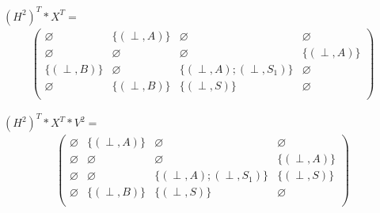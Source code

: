 \documentclass[12pt]{article}  %
\theoremstyle{definition}
\theoremstyle{remark}
\begin{document}
$(H^2)^T * X^T =$
\begin{align*}
\begin{pmatrix}
      \varnothing            & \{ (\perp,A) \}            & \varnothing            & \varnothing            \\
      \varnothing        & \varnothing            & \varnothing                & \{ (\perp,A) \}            \\
      \{ (\perp,B) \}            & \varnothing            & \{ (\perp,A);(\perp,S_1) \}            & \varnothing      \\
      \varnothing            & \{ (\perp,B) \}            & \{ (\perp,S) \}      & \varnothing  \\
\end{pmatrix}
\end{align*}



$(H^2)^T * X^T * V^2 =$
\begin{align*}
\begin{pmatrix}
      \varnothing            & \{ (\perp,A) \}            & \varnothing            & \varnothing            \\
      \varnothing        & \varnothing            & \varnothing                & \{ (\perp,A) \}            \\
      \varnothing            & \varnothing            & \{ (\perp,A);(\perp,S_1) \}            & \{ (\perp,S) \}     \\
      \varnothing            & \{ (\perp,B) \}            & \{ (\perp,S) \}      & \varnothing  \\
\end{pmatrix}
\end{align*}
\end{document}
